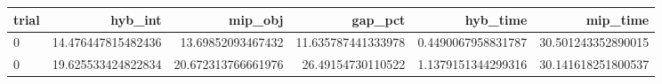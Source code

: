 \begin{tabular}{lrrrrr}
\hline
trial & hyb_int & mip_obj & gap_pct & hyb_time & mip_time \\ \hline
0 & 14.476447815482436 & 13.69852093467432 & 11.635787441333978 & 0.4490067958831787 & 30.501243352890015 \\
0 & 19.625533424822834 & 20.672313766661976 & 26.49154730110522 & 1.1379151344299316 & 30.141618251800537 \\
\hline
\end{tabular}
